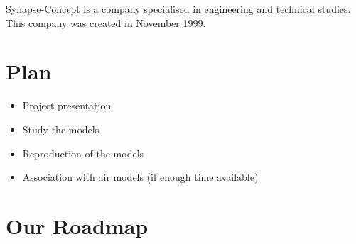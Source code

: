 \documentclass{article}
\begin{document}
Synapse-Concept is a company specialised in engineering and technical studies. This company was created in November 1999.

\section*{Plan}

\begin{itemize}
    \item Project presentation
    \item Study the models
    \item Reproduction of the models
    \item Association with air models (if enough time available)
\end{itemize}

\section*{Our Roadmap}
\end{document}
